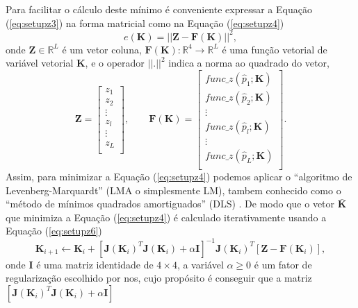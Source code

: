 \documentclass[a4paper, 12pt]{article}
\begin{document}
Para facilitar o cálculo deste mínimo é conveniente expressar a Equação (\ref{eq:setupz3})
na forma matricial como na Equação (\ref{eq:setupz4})
\begin{equation}\label{eq:setupz4}
e\left(\mathbf{K}\right)=|| \mathbf{Z}-\mathbf{F}(\mathbf{K}) ||^2,
\end{equation}
onde $\mathbf{Z}\in \mathbb{R}^L$ é um vetor coluna, 
$\mathbf{F}(\mathbf{K}):\mathbb{R}^4 \rightarrow \mathbb{R}^L$ é uma 
função vetorial de variável vetorial $\mathbf{K}$, e o operador $||.||^2$ indica a norma ao quadrado do vetor,
\begin{equation}
\mathbf{Z}=
\begin{bmatrix}
z_1\\
z_2\\
\vdots\\
z_l\\
\vdots\\
z_L\\
\end{bmatrix},
\qquad
\mathbf{F}(\mathbf{K})=
\begin{bmatrix}
func\_z(\hat{p}_1;\mathbf{K})\\
func\_z(\hat{p}_2;\mathbf{K})\\
\vdots\\
func\_z(\hat{p}_l;\mathbf{K})\\
\vdots\\
func\_z(\hat{p}_L;\mathbf{K})\\
\end{bmatrix}.
\end{equation}
Assim, para minimizar a Equação (\ref{eq:setupz4}) podemos aplicar o
``algoritmo de Levenberg-Marquardt'' (LMA o simplesmente LM), 
tambem conhecido como o ``método de mínimos quadrados amortiguados'' (DLS)
\cite[pp. 232-234]{doicu2010numerical} \cite[pp. 82]{pujaicoriverafernando2020}.
De modo que o vetor $\mathbf{\bar{K}}$ que minimiza a  Equação (\ref{eq:setupz4})
é calculado iterativamente usando a  Equação (\ref{eq:setupz6}) 
\begin{equation}\label{eq:setupz6}
\mathbf{K}_{i+1}\leftarrow\mathbf{K}_{i}+ 
\left[\mathbf{J}(\mathbf{K}_i)^{T}\mathbf{J}(\mathbf{K}_i)+\alpha\mathbf{I}\right]^{-1}
\mathbf{J}(\mathbf{K}_i)^{T}\left[\mathbf{Z}-\mathbf{F}(\mathbf{K}_i)\right],
\end{equation}
onde $\mathbf{I}$ é uma matriz identidade de $4\times 4$, 
a variável $\alpha\geq 0$ é um fator de regularização escolhido por nos,
cujo propósito é conseguir que a matriz 
$\left[\mathbf{J}(\mathbf{K}_i)^{T}\mathbf{J}(\mathbf{K}_i)+\alpha\mathbf{I}\right]$
\end{document}
